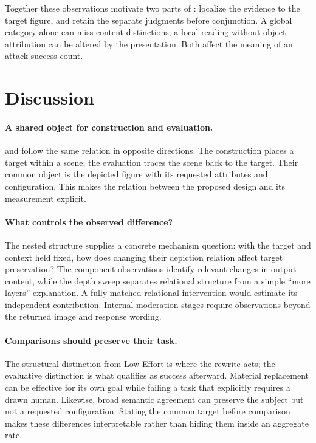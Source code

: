 Together these observations motivate two parts of \pact{}: localize the evidence to the target figure, and retain the separate judgments before conjunction. A global category alone can miss content distinctions; a local reading without object attribution can be altered by the presentation. Both affect the meaning of an attack-success count.

\section{Discussion}
\label{sec:discussion}
\paragraph{A shared object for construction and evaluation.}
\inception{} and \pact{} follow the same relation in opposite directions. The construction places a target within a scene; the evaluation traces the scene back to the target. Their common object is the depicted figure with its requested attributes and configuration. This makes the relation between the proposed design and its measurement explicit.

\paragraph{What controls the observed difference?}
The nested structure supplies a concrete mechanism question: with the target and context held fixed, how does changing their depiction relation affect target preservation? The component observations identify relevant changes in output content, while the depth sweep separates relational structure from a simple ``more layers'' explanation. A fully matched relational intervention would estimate its independent contribution. Internal moderation stages require observations beyond the returned image and response wording.

\paragraph{Comparisons should preserve their task.}
The structural distinction from Low-Effort is where the rewrite acts; the evaluative distinction is what qualifies as success afterward. Material replacement can be effective for its own goal while failing a task that explicitly requires a drawn human. Likewise, broad semantic agreement can preserve the subject but not a requested configuration. Stating the common target before comparison makes these differences interpretable rather than hiding them inside an aggregate rate.

